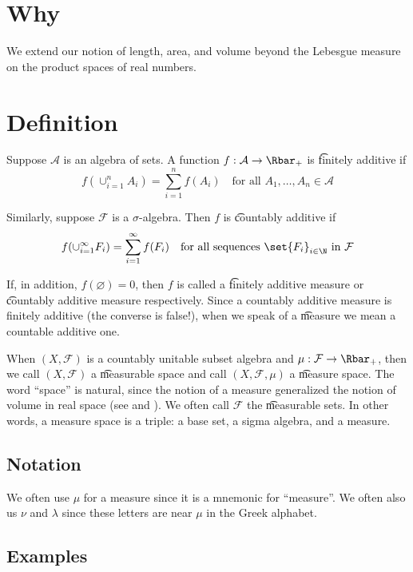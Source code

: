 
\section*{Why}

We extend our notion of length, area, and volume beyond the Lebesgue measure on the product spaces of real numbers.

\section*{Definition}

Suppose $\mathcal{A} $ is an algebra of sets.
A function $f: \mathcal{A}  \to \Rbar_+$ is \t{finitely additive} if
\[
f(\cup_{i = 1}^{n} A_i) = \sum_{i = 1}^{n} f(A_i) \quad \text{for all } A_1, \dots , A_n \in \mathcal{A}
\]

Similarly, suppose $\mathcal{F} $ is a $\sigma $-algebra.
Then $f$ is \t{countably additive} if
\[
f(\cup_{i = 1}^{\infty} F_i) = \sum_{i =1 }^{\infty} f(F_i) \quad \text{for all sequences } \set{F_i}_{i \in \N  } \text{ in } \mathcal{F}
\]

If, in addition, $f(\varnothing) = 0$, then $f$ is called a \t{finitely additive measure} or \t{countably additive measure} respectively.
Since a countably additive measure is finitely additive (the converse is false!), when we speak of a \t{measure} we mean a countable additive one.

When $(X, \mathcal{F} )$ is a countably unitable subset algebra and $\mu : \mathcal{F}  \to \Rbar_+$, then we call $(X, \mathcal{F} )$ a \t{measurable space} and call $(X, \mathcal{F} , \mu )$ a \t{measure space}.
The word ``space'' is natural, since the notion of a measure generalized the notion of volume in real space (see and ).
We often call $\mathcal{F} $ the \t{measurable sets}.
In other words, a measure space is a triple: a base set, a sigma algebra, and a measure.

\subsection*{Notation}

We often use $\mu $ for a measure since it is a mnemonic for ``measure''.
We often also us $\nu $ and $\lambda $ since these letters are near $\mu $ in the Greek alphabet.

\subsection*{Examples}

